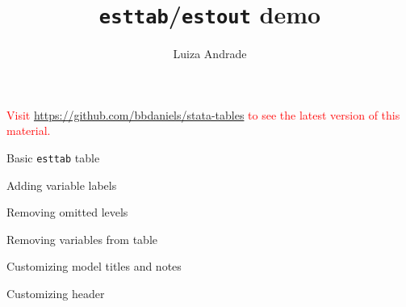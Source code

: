 \documentclass[11pt,a4paper]{article}
\title{\texttt{esttab}/\texttt{estout} demo}
\author{Luiza Andrade}
\affil{World Bank, Development Impact Evaluations lcardoso@worldbank.org}
\begin{document}
\maketitle

\listoftables



\textcolor{red}{Visit \url{https://github.com/bbdaniels/stata-tables} to see the latest version of this material.}


\begin{table}[H]
	\caption{Basic \texttt{esttab} table}
	\begin{adjustbox}{max width = \textwidth}
		
	\end{adjustbox}
\end{table}
 
\begin{table}[H]
	\caption{Adding variable labels}
	\begin{adjustbox}{max width = \textwidth}
		
	\end{adjustbox}
\end{table}

\begin{table}[H]
	\caption{Removing omitted levels}
	\begin{adjustbox}{max width = \textwidth}
		
	\end{adjustbox}
\end{table}


\begin{table}[H]
	\caption{Removing variables from table}
	\begin{adjustbox}{max width = \textwidth}
		
	\end{adjustbox}
\end{table}

\begin{table}[H]
	\caption{Customizing model titles and notes}
	\begin{adjustbox}{max width = \textwidth}
		
	\end{adjustbox}
\end{table}

\begin{table}[H]
	\caption{Customizing header}
	\begin{adjustbox}{max width = \textwidth}
		
	\end{adjustbox}
\end{table}
\end{document}
